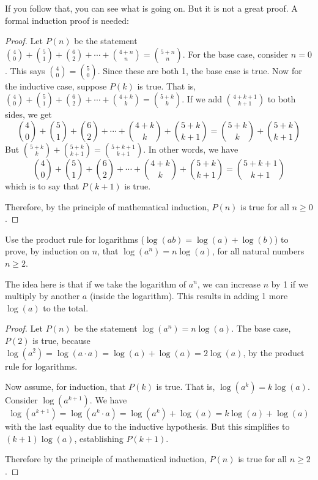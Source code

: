 \begin{questions}
\begin{answer}
		If you follow that, you can see what is going on.  But it is not a great proof.  A formal induction proof is needed:
		
		\begin{proof}
			Let $P(n)$ be the statement ${4 \choose 0} + {5 \choose 1} + {6 \choose 2} + \cdots + {4+n \choose n} = {5+n \choose n}$.  For the base case, consider $n = 0$.  This says ${4 \choose 0} = {5 \choose 0}$.  Since these are both 1, the base case is true.  Now for the inductive case, suppose $P(k)$ is true.  That is, ${4 \choose 0} + {5 \choose 1} + {6 \choose 2} + \cdots + {4+k \choose k} = {5+k \choose k}$.  If we add ${4+k+1 \choose k+1}$ to both sides, we get \[{4 \choose 0} + {5 \choose 1} + {6 \choose 2} + \cdots + {4+k \choose k} + {5+k \choose k+1}= {5+k \choose k} + {5+k \choose k+1}\]
			But ${5+k \choose k} + {5+k \choose k+1} = {5+k+1 \choose k+1}$.  In other words, we have
			\[{4 \choose 0} + {5 \choose 1} + {6 \choose 2} + \cdots + {4+k \choose k} + {5+k \choose k+1} = {5+k+1 \choose k+1}\]
			which is to say that $P(k+1)$ is true.
			
			Therefore, by the principle of mathematical induction, $P(n)$ is true for all $n \ge 0$.
		\end{proof}
	\end{answer}
	
	
\question Use the product rule for logarithms ($\log(ab) = \log(a) + \log(b)$) to prove, by induction on $n$, that $\log(a^n) = n \log(a)$, for all natural numbers $n \ge 2$.

	\begin{answer}
		The idea here is that if we take the logarithm of $a^n$, we can increase $n$ by 1 if we multiply by another $a$ (inside the logarithm).  This results in adding 1 more $\log(a)$ to the total.
		
		\begin{proof}
			Let $P(n)$ be the statement $\log(a^n) = n \log(a)$.  The base case, $P(2)$ is true, because $\log(a^2) = \log(a\cdot a) = \log(a) + \log(a) = 2\log(a)$, by the product rule for logarithms.
			
			Now assume, for induction, that $P(k)$ is true.  That is, $\log(a^k) = k\log(a)$.  Consider $\log(a^{k+1})$.  We have
			\[\log(a^{k+1}) = \log(a^k\cdot a) = \log(a^k) + \log(a) = k\log(a) + \log(a)\]
			with the last equality due to the inductive hypothesis.  But this simplifies to $(k+1) \log(a)$, establishing $P(k+1)$.
			
			Therefore by the principle of mathematical induction, $P(n)$ is true for all $n \ge 2$.	
		\end{proof}
	\end{answer}
	

\end{questions}
